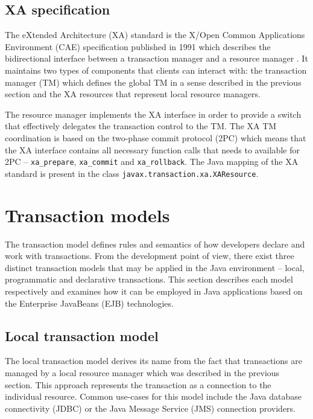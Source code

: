 \documentclass[oneside,
  digital, %
  table,   %
  lof,     %
  lot,     %
]{fithesis3}
\begin{document}
\subsection{XA specification}

The eXtended Architecture (XA) standard is the X/Open Common Applications Environment (CAE) specification published in 1991 which describes the bidirectional interface between a transaction manager and a resource manager \cite{xa_spec}. It maintains two types of components that clients can interact with: the transaction manager (TM) which defines the global TM in a sense described in the previous section and the XA resources that represent local resource managers.

The resource manager implements the XA interface in order to provide a switch that effectively delegates the transaction control to the TM. The XA TM coordination is based on the two-phase commit protocol (2PC) which means that the XA interface contains all necessary function calls that needs to available for 2PC -- \texttt{xa\_prepare}, \texttt{xa\_commit} and \texttt{xa\_rollback}. The Java mapping of the XA standard is present in the class \texttt{javax.transaction.xa.XAResource}.



\section{Transaction models}

The transaction model defines rules and semantics of how developers declare and work with transactions. From the development point of view, there exist three distinct transaction models that may be applied in the Java environment -- local, programmatic and declarative transactions. This section describes each model respectively and examines how it can be employed in Java applications based on the Enterprise JavaBeans (EJB) technologies.

\subsection{Local transaction model}

The local transaction model derives its name from the fact that transactions are managed by a local resource manager which was described in the previous section. This approach represents the transaction as a connection to the individual resource. Common use-cases for this model include the Java database connectivity (JDBC) or the Java Message Service (JMS) connection providers.
\end{document}
